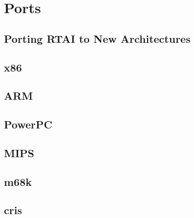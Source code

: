 \chapter{Ports}
\label{chap:ports}

\section{Porting RTAI to New Architectures}
\section{x86}
\section{ARM}
\section{PowerPC}
\section{MIPS}
\section{m68k}
\section{cris}

